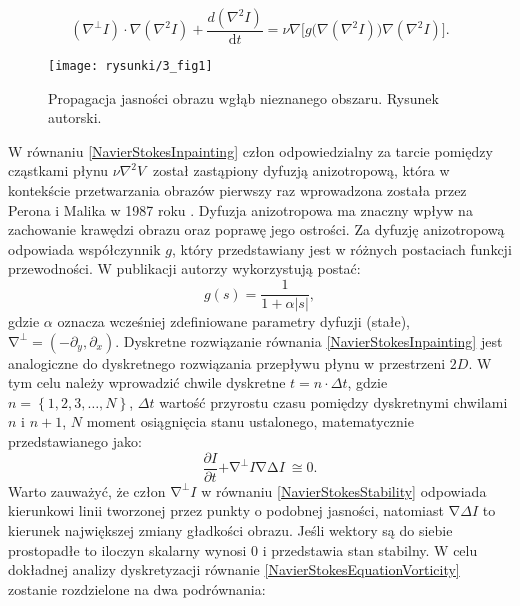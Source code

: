 \documentclass[12pt, twoside, openany]{report}
\theoremstyle{definition}
\begin{document}
\begin{equation}
\left( \nabla ^ \bot I \right) \cdot \nabla \left(\nabla^{2} I \right) +\frac{d\left( \nabla ^{2}I\right)}{\mathrm{d}t} = \nu \nabla \Big[ g \Big( \nabla \left(\nabla ^2 I \right) \Big) \nabla \left( \nabla^2 I \right) \Big]
\label{NavierStokesInpainting}
.
\end{equation}
\begin{figure}[!h]
	\centering
	\texttt{[image: rysunki/3\_fig1]}
	\caption{Propagacja jasności obrazu wgłąb nieznanego obszaru. Rysunek autorski.}
	\label{3_fig1}
\end{figure}
W równaniu \eqref{NavierStokesInpainting} człon odpowiedzialny za tarcie pomiędzy cząstkami płynu $\nu {\nabla }^2V\ $ został zastąpiony dyfuzją anizotropową, która w kontekście przetwarzania obrazów pierwszy raz wprowadzona została przez Perona i Malika w 1987 roku \cite{perona1990scale}.
Dyfuzja anizotropowa ma znaczny wpływ na zachowanie krawędzi obrazu oraz poprawę jego ostrości. Za dyfuzję anizotropową odpowiada współczynnik $g$, który przedstawiany jest w różnych postaciach funkcji przewodności. W publikacji \cite{au2001image} autorzy wykorzystują postać:
\begin{equation}
g\left(s\right)=\frac{1}{1+\alpha \left|s\right|}
,
\end{equation}
gdzie $\alpha$ oznacza wcześniej zdefiniowane parametry dyfuzji (stałe), ${\mathrm{\nabla }}^{\bot }=({-\partial }_y,{\partial }_x)$. 
Dyskretne rozwiązanie równania \eqref{NavierStokesInpainting} jest analogiczne do dyskretnego rozwiązania przepływu płynu w przestrzeni $2D$. W tym celu należy wprowadzić chwile dyskretne $t=n\cdot \Delta t$, gdzie $n=\left\{1,2,3,\dots ,N\right\}$, $\Delta t$ wartość przyrostu czasu pomiędzy dyskretnymi chwilami $n$ i $n+1$, $N$ moment osiągnięcia stanu ustalonego, matematycznie przedstawianego jako:
\begin{equation}
\frac{\partial I}{\partial t}\mathrm{+}{\mathrm{\nabla }}^{\mathrm{\bot }}I\mathrm{\nabla }\mathrm{\Delta }I\mathrm{\ }\mathrm{\cong }\mathrm{0}
\label{NavierStokesStability}
.
\end{equation}
Warto zauważyć, że człon ${\mathrm{\nabla }}^{\bot }I$ w równaniu \eqref{NavierStokesStability} odpowiada kierunkowi linii tworzonej przez punkty o podobnej jasności, natomiast $\mathrm{\nabla }\Delta I$ to kierunek największej zmiany gładkości obrazu. Jeśli wektory są do siebie prostopadłe to iloczyn skalarny wynosi 0 i przedstawia stan stabilny. 
W celu dokładnej analizy dyskretyzacji równanie \eqref{NavierStokesEquationVorticity} zostanie rozdzielone na dwa podrównania:
\end{document}
